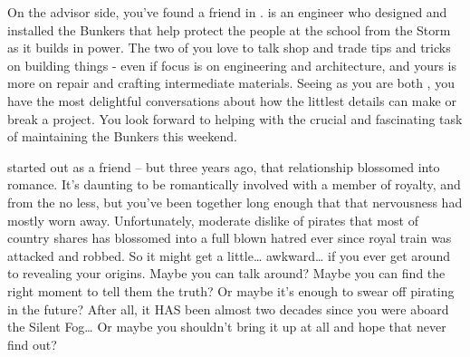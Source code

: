 \documentclass[char]{GL2020}
\begin{document}
On the advisor side, you've found a friend in \cBunker{\full}. \cBunker{} is an engineer who designed and installed the Bunkers that help protect the people at the school from the Storm as it builds in power. The two of you love to talk shop and trade tips and tricks on building things - even if \cBunker{\their} focus is on engineering and architecture, and yours is more on repair and crafting intermediate materials. Seeing as you are both \pShippies{}, you have the most delightful conversations about how the littlest details can make or break a project. You look forward to helping \cBunker{} with the crucial and fascinating task of maintaining the Bunkers this weekend.

\cPrince{\full} started out as a friend -- but three years ago, that relationship blossomed into romance. It's daunting to be romantically involved with a member of royalty, and from the \pFarm{} no less, but you've been together long enough that that nervousness had mostly worn away. Unfortunately, \cPrince{\their} moderate dislike of pirates that most of \cPrince{\their} country shares has blossomed into a full blown hatred ever since \cPrince{\their} royal train was attacked and \cPrince{\they} \cPrince{\were} robbed. So it might get a little\ldots{} awkward\ldots{} if you ever get around to revealing your origins. Maybe you can talk \cPrince{\them} around? Maybe you can find the right moment to tell them the truth? Or maybe it's enough to swear off pirating in the future? After all, it HAS been almost two decades since you were aboard the Silent Fog\ldots{} Or maybe you shouldn't bring it up at all and hope that \cPirate{\they} never find\cPirate{\plural} out?
\end{document}
